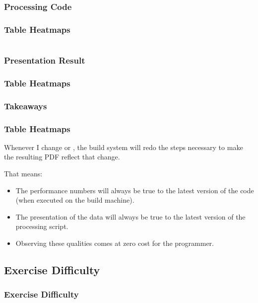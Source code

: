 {\subsubsection{Processing Code}
\begin{frame}[fragile]
  \frametitle{Table Heatmaps }
  \vspace{0mm}
  
  \begin{multicols}{2}
    \inputminted[fontsize=\tiny]{python}{../src/table_heatmap/process.py}
  \end{multicols}
\end{frame}

\subsubsection{Presentation Result}
\begin{frame}[fragile]
  \frametitle{Table Heatmaps }
  \vspace{24mm}
  \scalebox{0.9}{
    
  }
\end{frame}

\subsubsection{Takeaways}
\begin{frame}[fragile]
  \frametitle{Table Heatmaps }
  \vspace{3mm}
  Whenever I change  or , the build system will redo the steps necessary to make the resulting PDF reflect that change.
  
  \vspace{5mm}
  That means:
  \begin{itemize}
    \item The performance numbers will always be true to the latest version of the code (when executed on the build machine).
    \item The presentation of the data will always be true to the latest version of the processing script.
    \item Observing these qualities comes at zero cost for the programmer.
  \end{itemize}
\end{frame}

\subsection{Exercise Difficulty}
\begin{frame}[fragile]
  \frametitle{Exercise Difficulty}
  \vspace{3mm}
  

\end{frame}}
